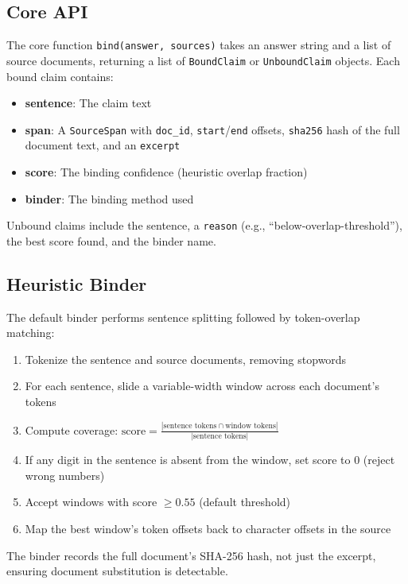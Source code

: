 \documentclass{article}
\begin{document}
\subsection{Core API}

The core function \texttt{bind(answer, sources)} takes an answer string and a list of source documents, returning a list of \texttt{BoundClaim} or \texttt{UnboundClaim} objects. Each bound claim contains:

\begin{itemize}
\item \textbf{sentence}: The claim text
\item \textbf{span}: A \texttt{SourceSpan} with \texttt{doc\_id}, \texttt{start}/\texttt{end} offsets, \texttt{sha256} hash of the full document text, and an \texttt{excerpt}
\item \textbf{score}: The binding confidence (heuristic overlap fraction)
\item \textbf{binder}: The binding method used
\end{itemize}

Unbound claims include the sentence, a \texttt{reason} (e.g., ``below-overlap-threshold''), the best score found, and the binder name.

\subsection{Heuristic Binder}

The default binder performs sentence splitting followed by token-overlap matching:

\begin{enumerate}
\item Tokenize the sentence and source documents, removing stopwords
\item For each sentence, slide a variable-width window across each document's tokens
\item Compute coverage: $\text{score} = \frac{|\text{sentence tokens} \cap \text{window tokens}|}{|\text{sentence tokens}|}$
\item If any digit in the sentence is absent from the window, set score to 0 (reject wrong numbers)
\item Accept windows with score $\geq 0.55$ (default threshold)
\item Map the best window's token offsets back to character offsets in the source
\end{enumerate}

The binder records the full document's SHA-256 hash, not just the excerpt, ensuring document substitution is detectable.
\end{document}
